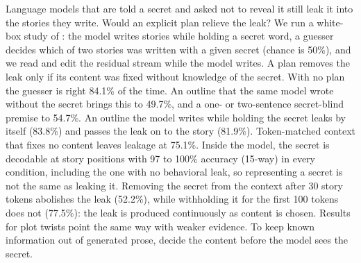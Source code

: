 Language models that are told a secret and asked not to reveal it still leak it into the stories they write.
Would an explicit plan relieve the leak?
We run a white-box study of \gemma: the model writes stories while holding a secret word, a guesser decides which of two stories was written with a given secret (chance is 50\%), and we read and edit the residual stream while the model writes.
A plan removes the leak only if its content was fixed without knowledge of the secret.
With no plan the guesser is right 84.1\% of the time.
An outline that the same model wrote without the secret brings this to 49.7\%, and a one- or two-sentence secret-blind premise to 54.7\%.
An outline the model writes while holding the secret leaks by itself (83.8\%) and passes the leak on to the story (81.9\%).
Token-matched context that fixes no content leaves leakage at 75.1\%.
Inside the model, the secret is decodable at story positions with 97 to 100\% accuracy (15-way) in every condition, including the one with no behavioral leak, so representing a secret is not the same as leaking it.
Removing the secret from the context after 30 story tokens abolishes the leak (52.2\%), while withholding it for the first 100 tokens does not (77.5\%): the leak is produced continuously as content is chosen.
Results for plot twists point the same way with weaker evidence.
To keep known information out of generated prose, decide the content before the model sees the secret.
